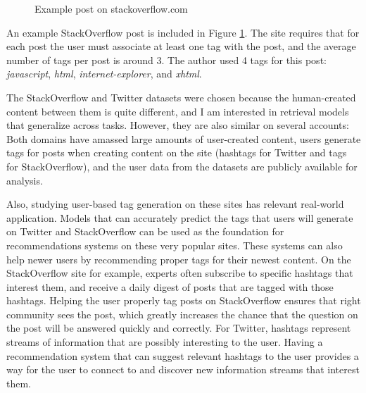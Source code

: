 \documentclass[man,floatsintext,donotrepeattitle]{apa6}
\begin{document}
\begin{figure}[!htbp]
  \caption{Example post on stackoverflow.com}
  \label{figSOExample}
\end{figure}

An example StackOverflow post is included in Figure \ref{figSOExample}.
The site requires that for each post the user must associate at least one tag with the post, and the average number of tags per post is around 3.
The author used 4 tags for this post: \emph{javascript}, \emph{html}, \emph{internet-explorer}, and \emph{xhtml}.

The StackOverflow and Twitter datasets were chosen because the human-created content between them is quite different, and I am interested in retrieval models that generalize across tasks.
However, they are also similar on several accounts:
Both domains have amassed large amounts of user-created content, users generate tags for posts when creating content on the site (hashtags for Twitter and tags for StackOverflow),
and the user data from the datasets are publicly available for analysis.

Also, studying user-based tag generation on these sites has relevant real-world application.
Models that can accurately predict the tags that users will generate on Twitter and StackOverflow can be used as the foundation for recommendations systems on these very popular sites.
These systems can also help newer users by recommending proper tags for their newest content.
On the StackOverflow site for example, experts often subscribe to specific hashtags that interest them, and receive a daily digest of posts that are tagged with those hashtags.
Helping the user properly tag posts on StackOverflow ensures that right community sees the post, which greatly increases the chance that the question on the post will be answered quickly and correctly.
For Twitter, hashtags represent streams of information that are possibly interesting to the user.
Having a recommendation system that can suggest relevant hashtags to the user provides a way for the user to connect to and discover new information streams that interest them.
\end{document}

